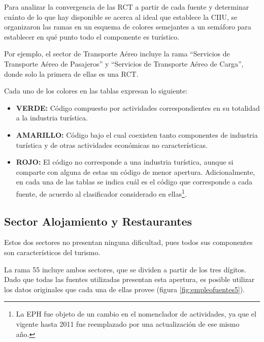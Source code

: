 \documentclass[
  openany]{book}
\providecommand{\tightlist}{%
  \setlength{\itemsep}{0pt}\setlength{\parskip}{0pt}}
\begin{document}
Para analizar la convergencia de las RCT a partir de cada fuente y determinar cuánto de lo que hay disponible se acerca al ideal que establece la CIIU, se organizaron las ramas en un esquema de colores semejantes a un semáforo para establecer en qué punto todo el componente es turístico.

Por ejemplo, el sector de Transporte Aéreo incluye la rama ``Servicios de Transporte Aéreo de Pasajeros'' y ``Servicios de Transporte Aéreo de Carga'', donde solo la primera de ellas es una RCT.

Cada uno de los colores en las tablas expresan lo siguiente:

\begin{itemize}
\tightlist
\item
  \textbf{VERDE:} Código compuesto por actividades correspondientes en su totalidad a la industria turística.
\item
  \textbf{AMARILLO:} Código bajo el cual coexisten tanto componentes de industria turística y de otras actividades económicas no características.
\item
  \textbf{ROJO:} El código no corresponde a una industria turística, aunque si comparte con alguna de estas un código de menor apertura. Adicionalmente, en cada una de las tablas se indica cuál es el código que corresponde a cada fuente, de acuerdo al clasificador considerado en ellas\footnote{La EPH fue objeto de un cambio en el nomenclador de actividades, ya que el vigente hasta 2011 fue reemplazado por una actualización de ese mismo año.}.
\end{itemize}

\hypertarget{sector-alojamiento-y-restaurantes}{%
\subsection{Sector Alojamiento y Restaurantes}\label{sector-alojamiento-y-restaurantes}}

Estos dos sectores no presentan ninguna dificultad, pues todos sus componentes son característicos del turismo.

La rama 55 incluye ambos sectores, que se dividen a partir de los tres dígitos.
Dado que todas las fuentes utilizadas presentan esta apertura, es posible utilizar los datos originales que cada una de ellas provee (figura \ref{fig:empleofuentes5}).
\end{document}
